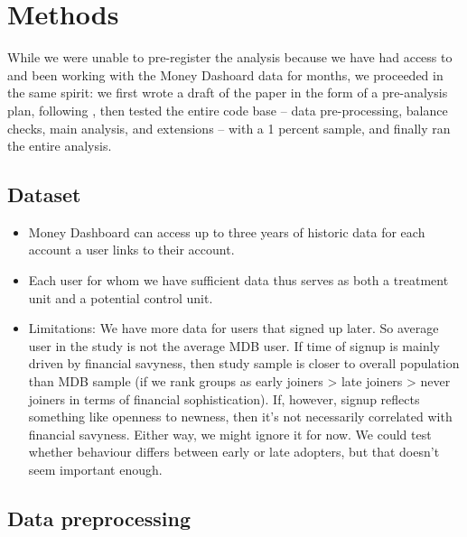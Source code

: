 
\section{Methods}%
\label{sec:data}

While we were unable to pre-register the analysis because we have had access to
and been working with the Money Dashoard data for months, we proceeded in the
same spirit: we first wrote a draft of the paper in the form of a pre-analysis
plan, following \citet{olken2015promises}, then tested the entire code base --
data pre-processing, balance checks, main analysis, and extensions -- with a 1
percent sample, and finally ran the entire analysis.


\subsection{Dataset}%
\label{sub:dataset}

\begin{itemize}

    \item Money Dashboard can access up to three years of historic data for
        each account a user links to their account.

    \item Each user for whom we have sufficient data thus serves as both a
        treatment unit and a potential control unit.

    \item Limitations: We have more data for users that signed up later. So average user in
        the study is not the average MDB user. If time of signup is mainly
        driven by financial savyness, then study sample is closer to overall
        population than MDB sample (if we rank groups as early joiners > late
        joiners > never joiners in terms of financial sophistication). If,
        however, signup reflects something like openness to newness, then it's
        not necessarily correlated with financial savyness. Either way, we
        might ignore it for now. We could test whether behaviour differs
        between early or late adopters, but that doesn't seem important enough.

\end{itemize}

\subsection{Data preprocessing}%
\label{sub:data_preprocessing}


